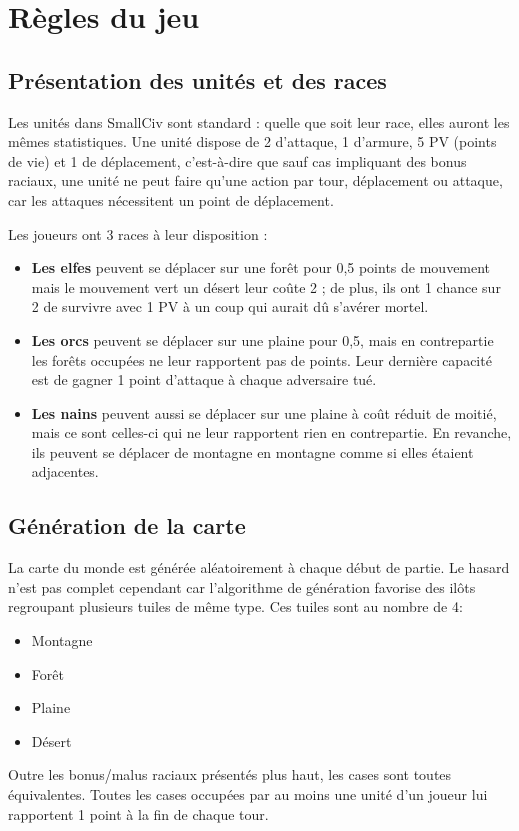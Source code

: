 \section{Règles du jeu}

\subsection{Présentation des unités et des races}
Les unités dans SmallCiv sont standard : quelle que soit leur race, elles auront les mêmes statistiques. Une unité dispose de 2 d'attaque, 1 d'armure, 5 PV (points de vie) et 1 de déplacement, c'est-à-dire que sauf cas impliquant des bonus raciaux, une unité ne peut faire qu'une action par tour, déplacement ou attaque, car les attaques nécessitent un point de déplacement. \newline

Les joueurs ont 3 races à leur disposition :\newline
\begin{itemize}\renewcommand{\labelitemi}{$\bullet$}
\item \textbf{Les elfes} peuvent se déplacer sur une forêt pour 0,5 points de mouvement mais le mouvement vert un désert leur coûte 2 ; de plus, ils ont 1 chance sur 2 de survivre avec 1 PV à un coup qui aurait dû s'avérer mortel.
\item \textbf{Les orcs} peuvent se déplacer sur une plaine pour 0,5, mais en contrepartie les forêts occupées ne leur rapportent pas de points. Leur dernière capacité est de gagner 1 point d'attaque à chaque adversaire tué.
\item \textbf{Les nains} peuvent aussi se déplacer sur une plaine à coût réduit de moitié, mais ce sont celles-ci qui ne leur rapportent rien en contrepartie. En revanche, ils peuvent se déplacer de montagne en montagne comme si elles étaient adjacentes.
\end{itemize}

\subsection{Génération de la carte}
La carte du monde est générée aléatoirement à chaque début de partie. Le hasard n'est pas complet cependant car l'algorithme de génération favorise des ilôts regroupant plusieurs tuiles de même type. Ces tuiles sont au nombre de 4:\newline
\begin{itemize}
\item Montagne
\item Forêt
\item Plaine 
\item Désert
\end{itemize}
Outre les bonus/malus raciaux présentés plus haut, les cases sont toutes équivalentes. Toutes les cases occupées par au moins une unité d'un joueur lui rapportent 1 point à la fin de chaque tour. \newline

